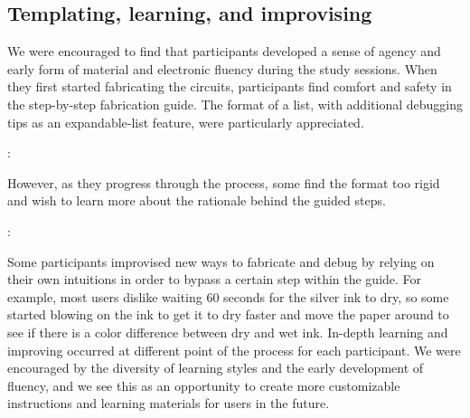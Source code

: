 \documentclass{sigchi}
\begin{document}
\subsection{Templating, learning, and improvising}
We were encouraged to find that participants developed a sense of agency and early form of material and electronic fluency during the study sessions. When they first started fabricating the circuits, participants find comfort and safety in the step-by-step fabrication guide. The format of a list, with additional debugging tips as an expandable-list feature, were particularly appreciated. 
  \begin{myquote}
  \vspace{-2pt}
    :
    \vspace{-2pt}
  \end{myquote}
However, as they progress through the process, some find the format too rigid and wish to learn more about the rationale behind the guided steps. 

  \begin{myquote}
  \vspace{-2pt}
    :
    \vspace{-2pt}
  \end{myquote}
  
  Some participants improvised new ways to fabricate and debug by relying on their own intuitions in order to bypass a certain step within the guide. For example, most users dislike waiting 60 seconds for the silver ink to dry, so some started blowing on the ink to get it to dry faster and move the paper around to see if there is a color difference between dry and wet ink. In-depth learning and improving occurred at different point of the process for each participant. We were encouraged by the diversity of learning styles and the early development of fluency, and we see this as an opportunity to create more customizable instructions and learning materials for users in the future. 
\end{document}
